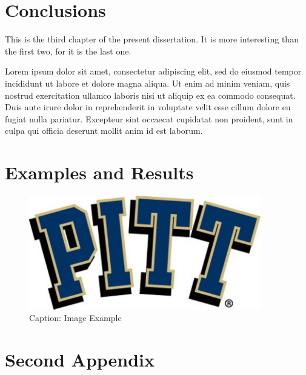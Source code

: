 \documentclass[hidelinks,pdftex,phd]{pittetd}
\begin{document}
\chapter{Conclusions}
This is the third chapter of the present dissertation.\cite{DUMMY:6} It is more interesting than the first two, for it is the last one.\cite{DUMMY:7}

Lorem ipsum dolor sit amet, consectetur adipiscing elit, sed do eiusmod tempor incididunt ut labore et dolore magna aliqua.\cite{DUMMY:8} Ut enim ad minim veniam, quis nostrud exercitation ullamco laboris nisi ut aliquip ex ea commodo consequat.\cite{DUMMY:9} Duis aute irure dolor in reprehenderit in voluptate velit esse cillum dolore eu fugiat nulla pariatur.\cite{DUMMY:10} Excepteur sint occaecat cupidatat non proident, sunt in culpa qui officia deserunt mollit anim id est laborum.



\appendix     
\chapter{Examples and Results}
\begin{figure}[t]
    \centering
    \includegraphics[width=0.9\textwidth]{Images/Picture-Example.jpg}
    \caption{Caption: Image Example}
    
    \label{Reference: Picture Example}
\end{figure}

\chapter{Second Appendix}


\end{document}
